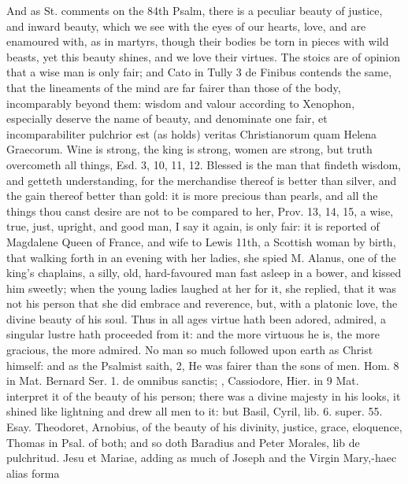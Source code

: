 {And as St. \Austin{} comments on the 84th Psalm, there is a peculiar
beauty of justice, and inward beauty, which we see with the eyes of our
hearts, love, and are enamoured with, as in martyrs, though their
bodies be torn in pieces with wild beasts, yet this beauty shines, and
we love their virtues. The stoics are of opinion that a wise man
is only fair; and Cato in Tully 3 de Finibus contends the same, that
the lineaments of the mind are far fairer than those of the body,
incomparably beyond them: wisdom and valour according to
Xenophon, especially deserve the name of beauty, and denominate
one fair, et incomparabiliter pulchrior est (as \Austin{} holds) veritas
Christianorum quam Helena Graecorum. Wine is strong, the king is
strong, women are strong, but truth overcometh all things, Esd.  3,
10, 11, 12. Blessed is the man that findeth wisdom, and getteth
understanding, for the merchandise thereof is better than silver, and
the gain thereof better than gold: it is more precious than pearls, and
all the things thou canst desire are not to be compared to her, Prov.
 13, 14, 15, a wise, true, just, upright, and good man, I say it
again, is only fair: it is reported of Magdalene Queen of France,
and wife to Lewis 11th, a Scottish woman by birth, that walking forth
in an evening with her ladies, she spied M. Alanus, one of the king's
chaplains, a silly, old, hard-favoured man fast asleep in a
bower, and kissed him sweetly; when the young ladies laughed at her for
it, she replied, that it was not his person that she did embrace and
reverence, but, with a platonic love, the divine beauty of his
soul. Thus in all ages virtue hath been adored, admired, a singular
lustre hath proceeded from it: and the more virtuous he is, the more
gracious, the more admired. No man so much followed upon earth as
Christ himself: and as the Psalmist saith,  2, He was fairer than
the sons of men. \Chrysostom{} Hom. 8 in Mat. Bernard Ser. 1. de omnibus
sanctis; \Austin{}, Cassiodore, Hier. in 9 Mat. interpret it of the
beauty of his person; there was a divine majesty in his looks, it
shined like lightning and drew all men to it: but Basil, Cyril, lib. 6.
super. 55. Esay. Theodoret, Arnobius, \etc{} of the beauty of his
divinity, justice, grace, eloquence, \etc{} Thomas in Psal.  of both;
and so doth Baradius and Peter Morales, lib de pulchritud. Jesu et
Mariae, adding as much of Joseph and the Virgin Mary,-haec alias forma
}
